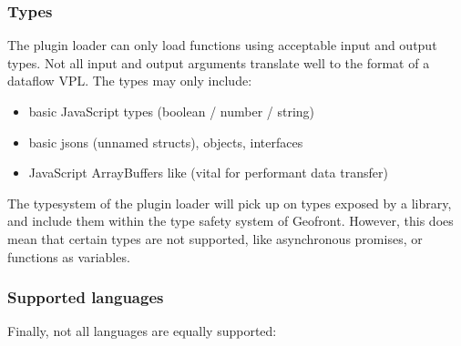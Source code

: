 \subsubsection*{Types}
The plugin loader can only load functions using acceptable input and output types. 
Not all input and output arguments translate well to the format of a dataflow VPL. 
The types may only include: 
\begin{itemize}
  \item basic JavaScript types (boolean / number / string)
  \item basic jsons (unnamed structs), objects, interfaces 
  \item JavaScript ArrayBuffers like  (vital for performant data transfer)
\end{itemize}
The typesystem of the plugin loader will pick up on types exposed by a library, and include them within the type safety system of Geofront. 
However, this does mean that certain types are not supported, like asynchronous promises, or functions as variables. 




\subsubsection*{Supported languages}
Finally, not all languages are equally supported:

